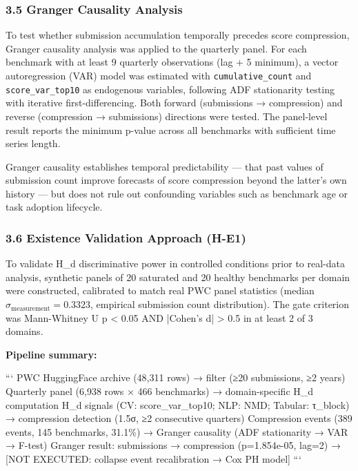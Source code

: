 \subsubsection{3.5 Granger Causality Analysis}

To test whether submission accumulation temporally precedes score compression, Granger causality analysis was applied to the quarterly panel. For each benchmark with at least 9 quarterly observations (lag + 5 minimum), a vector autoregression (VAR) model was estimated with \texttt{cumulative_count} and \texttt{score_var_top10} as endogenous variables, following ADF stationarity testing with iterative first-differencing. Both forward (submissions → compression) and reverse (compression → submissions) directions were tested. The panel-level result reports the minimum p-value across all benchmarks with sufficient time series length.

Granger causality establishes temporal predictability — that past values of submission count improve forecasts of score compression beyond the latter's own history — but does not rule out confounding variables such as benchmark age or task adoption lifecycle.

\subsubsection{3.6 Existence Validation Approach (H-E1)}

To validate H_d discriminative power in controlled conditions prior to real-data analysis, synthetic panels of 20 saturated and 20 healthy benchmarks per domain were constructed, calibrated to match real PWC panel statistics (median $\hat{\sigma}_{\text{measurement}} = 0.3323$, empirical submission count distribution). The gate criterion was Mann-Whitney U p < 0.05 AND |Cohen's d| > 0.5 in at least 2 of 3 domains.

\textbf{Pipeline summary:}

```
PWC HuggingFace archive (48,311 rows)
    → filter (≥20 submissions, ≥2 years)
Quarterly panel (6,938 rows × 466 benchmarks)
    → domain-specific H_d computation
H_d signals (CV: score_var_top10; NLP: NMD; Tabular: τ_block)
    → compression detection (1.5σ, ≥2 consecutive quarters)
Compression events (389 events, 145 benchmarks, 31.1\%)
    → Granger causality (ADF stationarity → VAR → F-test)
Granger result: submissions → compression (p=1.854e-05, lag=2)
    → [NOT EXECUTED: collapse event recalibration → Cox PH model]
```

